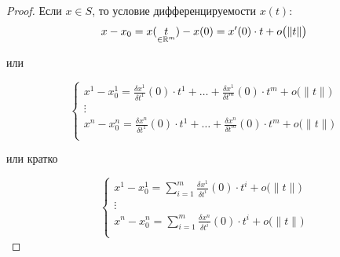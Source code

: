 \begin{proof}
    Если $x\in S$, то условие дифференцируемости $x(t)$:
    \[
        x-x_0 = x(\underset{\in\mathbb{R}^m}{t}) - x(0) = x'(0)\cdot t + o\big(\|t\|\big)
    \]
    \begin{center}
        или
    \end{center}
    \[
        \left\{\begin{array}{l}
            x^1 - x^1_0 = \frac{\delta x^1}{\delta t^1}(0)\cdot t^1 + \ldots + \frac{\delta x^1}{\delta t^m}(0)\cdot t^m + o\big(\|t\|\big) \\
            \vdots                                                                                                                          \\
            x^n - x^n_0 = \frac{\delta x^n}{\delta t^1}(0)\cdot t^1 + \ldots + \frac{\delta x^n}{\delta t^m}(0)\cdot t^m + o\big(\|t\|\big) \\
        \end{array}\right.
    \]
    \begin{center}
        или кратко
    \end{center}
    \begin{equation}\label{eq:26}
        \left\{\begin{array}{l}
            x^1 - x^1_0 = \sum_{i=1}^{m}\frac{\delta x^1}{\delta t^i}(0)\cdot t^i + o\big(\|t\|\big) \\
            \vdots                                                                                   \\
            x^n - x^n_0 = \sum_{i=1}^{m}\frac{\delta x^n}{\delta t^i}(0)\cdot t^i + o\big(\|t\|\big) \\
        \end{array}\right.
    \end{equation}


\end{proof}
